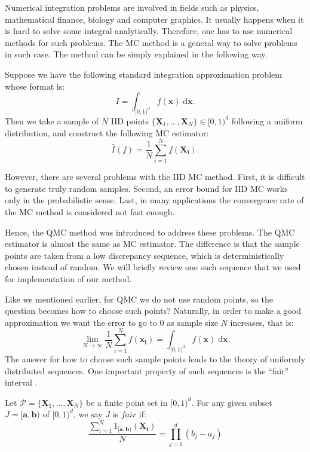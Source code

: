 
Numerical integration problems are involved in fields such as physics, mathematical finance, biology and computer graphics. 
It usually happens when it is hard to solve some integral analytically. Therefore, one has to use numerical methods for such problems.  
The MC method is a general way to solve problems in such case\cite{fishman2013monte}. The method can be simply explained in the following way. 

Suppose we have the following standard integration approximation problem whose format is: 
\begin{equation}
    \label{eq:setup}
    I= \int_{[0,1)^d}f(\mathbf{x})\;\textrm{d}\mathbf{x}.
\end{equation}
Then we take a sample of $N$ IID points $\{\mathbf{X}_1,\dots, \mathbf{X}_N\}\in [0,1)^d$ following a uniform distribution, and construct the following MC estimator:
\[
    \hat{I}(f)=\frac{1}{N}\sum_{i=1}^{N}f(\mathbf{X_i}).
\]

However, there are several problems with the IID MC method\cite{niederreiter2010quasi}.
First, it is difficult to generate truly random samples. Second, an error bound for IID MC works only in the probabilistic sense. 
Last, in many applications the convergence rate of the MC method is considered not fast enough. 

Hence, the QMC method was introduced to address these problems. 
The QMC estimator is almost the same as MC estimator. 
The difference is that the sample points are taken from a low discrepancy sequence, which is deterministically chosen instead of random.   
We will briefly review one such sequence that we used for implementation of our method. 

\newpage


Like we mentioned earlier, for QMC we do not use random points, so the question becomes how to choose such points?  
Naturally, in order to make a good approximation we want the error to go to $0$ as sample size $N$ increases, that is:
\[
    \lim_{N\to\infty}\frac{1}{N}\sum_{i=1}^{N}f(\mathbf{x_i})=\int_{[0,1)^d}f(\mathbf{x})\;\textrm{d}\mathbf{x}.
\]
The answer for how to choose such sample points leads to the theory of uniformly distributed sequences. 
One important property of such sequences is the ``fair'' interval \cite{dick2010digital}.
\theoremstyle{definition}
\begin{definition}{}
Let $\mathscr{P} =\{\mathbf{X}_1,\dots,\mathbf{X}_N\}$ be a finite point set in $[0, 1)^d$.
            For any given subset $J=[\mathbf{a},\mathbf{b})$ of $[0, 1)^d$, we say $J$ is $\textit{fair}$ if:  
    \[
        \frac{\sum_{i=1}^{N}1_{[\mathbf{a},\mathbf{b})}(\mathbf{X_i})}{N}
            =\prod_{j=1}^{d}(b_j-a_j)
                    \]
\end{definition}

